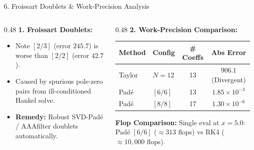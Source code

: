 \documentclass[aspectratio=169]{beamer}
\begin{document}
\begin{frame}{6. Froissart Doublets \& Work-Precision Analysis}
  \small
  \begin{columns}[T]
    \begin{column}{0.48\textwidth}
      \textbf{1. Froissart Doublets\footnotemark[1]:}
      \begin{itemize}\small
        \item Note $[2/3]$ (error $245.7$) is worse than $[2/2]$ (error $42.7$).
        \item Caused by spurious pole-zero pairs from ill-conditioned Hankel solve.
        \item \textbf{Remedy:} Robust SVD-Padé / AAA\footnotemark[3] filter doublets automatically.
      \end{itemize}
    \end{column}
    \begin{column}{0.48\textwidth}
      \textbf{2. Work-Precision Comparison\footnotemark[2]:}
      \centering
      \vskip2pt
      \scriptsize
      \setlength{\tabcolsep}{4pt}
      \begin{tabular}{llcc}
        \toprule
        \textbf{Method} & \textbf{Config} & \textbf{\# Coeffs} & \textbf{Abs Error} \\
        \midrule
        Taylor & $N = 12$ & 13 & $906.1$ (Divergent) \\
        Padé   & $[6/6]$  & 13 & $1.85 \times 10^{-3}$ \\
        Padé   & $[8/8]$  & 17 & $1.30 \times 10^{-6}$ \\
        \bottomrule
      \end{tabular}
      \vskip2pt
      \raggedright
      \scriptsize
      \textbf{Flop Comparison:} Single eval at $x=5.0$: Padé $[6/6]$ ($\approx 313$ flops) vs RK4 ($\approx 10,000$ flops).
    \end{column}
  \end{columns}
  \vskip4pt
\end{frame}
\end{document}
